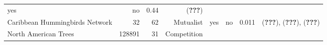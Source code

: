 \begin{longtable}[]{@{}lrrrrrrr@{}}
\begin{minipage}[t]{0.05\columnwidth}
yes\strut
\end{minipage} & \begin{minipage}[t]{0.04\columnwidth}\raggedleft\strut
no\strut
\end{minipage} & \begin{minipage}[t]{0.06\columnwidth}\raggedleft\strut
0.44\strut
\end{minipage} & \begin{minipage}[t]{0.22\columnwidth}\raggedleft\strut
({\textbf{???}})\strut
\end{minipage}\tabularnewline
\begin{minipage}[t]{0.15\columnwidth}\raggedright\strut
Caribbean Hummingbirds Network\strut
\end{minipage} & \begin{minipage}[t]{0.07\columnwidth}\raggedleft\strut
32\strut
\end{minipage} & \begin{minipage}[t]{0.07\columnwidth}\raggedleft\strut
62\strut
\end{minipage} & \begin{minipage}[t]{0.11\columnwidth}\raggedleft\strut
Mutualist\strut
\end{minipage} & \begin{minipage}[t]{0.05\columnwidth}\raggedleft\strut
yes\strut
\end{minipage} & \begin{minipage}[t]{0.04\columnwidth}\raggedleft\strut
no\strut
\end{minipage} & \begin{minipage}[t]{0.06\columnwidth}\raggedleft\strut
0.011\strut
\end{minipage} & \begin{minipage}[t]{0.22\columnwidth}\raggedleft\strut
({\textbf{???}}), ({\textbf{???}}), ({\textbf{???}})\strut
\end{minipage}\tabularnewline
\begin{minipage}[t]{0.15\columnwidth}\raggedright\strut
North American Trees\strut
\end{minipage} & \begin{minipage}[t]{0.07\columnwidth}\raggedleft\strut
128891\strut
\end{minipage} & \begin{minipage}[t]{0.07\columnwidth}\raggedleft\strut
31\strut
\end{minipage} & \begin{minipage}[t]{0.11\columnwidth}\raggedleft\strut
Competition\strut
\end{minipage} & \begin{minipage}[t]{0.05\columnwidth}\raggedleft\strut

\end{minipage}
\end{longtable}
